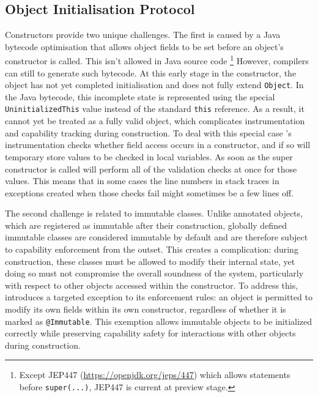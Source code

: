 

\subsection{Object Initialisation Protocol}

Constructors provide two unique challenges. The first is caused by a Java bytecode optimisation that allows object fields to be set before an object's constructor is called. This isn't allowed in Java source code \footnote{Except JEP447 (\url{https://openjdk.org/jeps/447}) which allows statements before \texttt{super(...)}, JEP447 is current at preview stage.} However, compilers  can still to generate such bytecode. At this early stage in the constructor, the object has not yet completed initialisation and does not fully extend  \texttt{Object}. In the Java bytecode, this incomplete state is represented using the special \texttt{UninitializedThis} value instead of the standard \texttt{this} reference. As a result, it cannot yet be treated as a fully valid object, which complicates instrumentation and capability tracking during construction.
To deal with this special case \jdala 's instrumentation checks whether field access occurs in a constructor, and if so will temporary store values to be checked in local variables. As soon as the super constructor is called \jdala will perform all of the validation checks at once for those values. This means that in some cases the line numbers in stack traces in \jdala exceptions created when those checks fail might sometimes be a few lines off. 


The second challenge is related to immutable classes. Unlike annotated objects, which are registered as immutable after their construction, globally defined immutable classes are considered immutable by default and are therefore subject to capability enforcement from the outset. This creates a complication: during construction, these classes must be allowed to modify their internal state, yet doing so must not compromise the overall soundness of the system, particularly with respect to other objects accessed within the constructor.
To address this, \jdala introduces a targeted exception to its enforcement rules: an object is permitted to modify its own fields within its own constructor, regardless of whether it is marked as \texttt{@Immutable}. This exemption allows immutable objects to be initialized correctly while preserving capability safety for interactions with other objects during construction.




